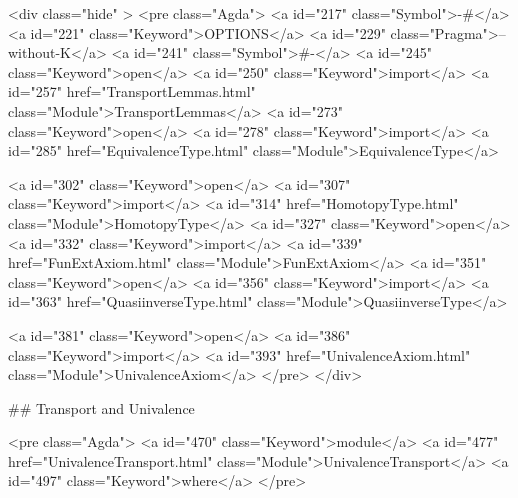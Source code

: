   <div class="hide" >
<pre class="Agda">
<a id="217" class="Symbol">{-#</a> <a id="221" class="Keyword">OPTIONS</a> <a id="229" class="Pragma">--without-K</a> <a id="241" class="Symbol">#-}</a>
<a id="245" class="Keyword">open</a> <a id="250" class="Keyword">import</a> <a id="257" href="TransportLemmas.html" class="Module">TransportLemmas</a>
<a id="273" class="Keyword">open</a> <a id="278" class="Keyword">import</a> <a id="285" href="EquivalenceType.html" class="Module">EquivalenceType</a>

<a id="302" class="Keyword">open</a> <a id="307" class="Keyword">import</a> <a id="314" href="HomotopyType.html" class="Module">HomotopyType</a>
<a id="327" class="Keyword">open</a> <a id="332" class="Keyword">import</a> <a id="339" href="FunExtAxiom.html" class="Module">FunExtAxiom</a>
<a id="351" class="Keyword">open</a> <a id="356" class="Keyword">import</a> <a id="363" href="QuasiinverseType.html" class="Module">QuasiinverseType</a>

<a id="381" class="Keyword">open</a> <a id="386" class="Keyword">import</a> <a id="393" href="UnivalenceAxiom.html" class="Module">UnivalenceAxiom</a>
</pre>
</div>

## Transport and Univalence

<pre class="Agda">
<a id="470" class="Keyword">module</a> <a id="477" href="UnivalenceTransport.html" class="Module">UnivalenceTransport</a> <a id="497" class="Keyword">where</a>
</pre>

